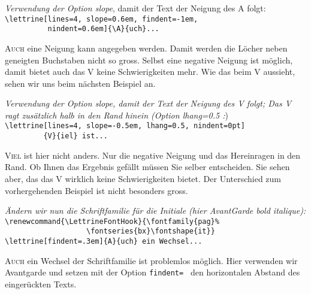 \documentclass[12pt,a4paper]{article}
\begin{document}
\vspace{\baselineskip}
\textit{Verwendung der Option {\ttfamily\upshape slope}}, damit der Text
der Neigung des {\glqq}A{\grqq} folgt:\\
\verb+\lettrine[lines=4, slope=0.6em, findent=-1em,+\\
\verb+          nindent=0.6em]{\A}{uch}...+

\lettrine[lines=4, slope=0.6em, findent=-1em, nindent=0.6em]{A}{uch} eine
Neigung kann angegeben werden. Damit werden die L\"ocher neben geneigten
Buchstaben nicht so gross. Selbst eine negative Neigung ist m\"oglich, damit
bietet auch das {\glqq}V{\grqq} keine Schwierigkeiten mehr. Wie das beim
{\glqq}V{\grqq} aussieht, sehen wir uns beim n\"achsten Beispiel an.

\vspace{\baselineskip}
\textit{Verwendung der Option {\ttfamily\upshape slope}, damit der Text
der Neigung des {\ttfamily\upshape V} folgt; Das {\ttfamily\upshape V} ragt 
zus\"atzlich halb in den Rand hinein 
(Option {\ttfamily\upshape lhang=0.5} :})\\
\verb+\lettrine[lines=4, slope=-0.5em, lhang=0.5, nindent=0pt]+\\
\verb+         {V}{iel} ist...+

\lettrine[lines=4, slope=-0.5em, lhang=0.5, nindent=0pt]{V}{iel} ist hier
nicht anders. Nur die negative Neigung und das Hereinragen in den Rand. Ob
Ihnen das Ergebnis gef\"allt m\"ussen Sie selber entscheiden.  Sie sehen aber,
das das {\glqq}V{\grqq} wirklich keine Schwierigkeiten bietet. Der Unterschied
zum vorhergehenden Beispiel ist nicht besonders gross.

\vspace{\baselineskip}
\textit{\"Andern wir nun die Schriftfamilie f\"ur die Initiale
(hier AvantGarde bold italique):}\\
\verb+\renewcommand{\LettrineFontHook}{\fontfamily{pag}%+\\
\verb+                   \fontseries{bx}\fontshape{it}}+\\
\verb+\lettrine[findent=.3em]{A}{uch} ein Wechsel...+

{%
\renewcommand{\LettrineFontHook}{\fontfamily{pag}\fontseries{bx}\fontshape{it}}

\lettrine[findent=.3em]{A}{uch} ein Wechsel der Schriftfamilie ist problemlos
m\"oglich. Hier verwenden wir Avantgarde und setzen mit der Option
\verb+findent= + den horizontalen Abstand des einger\"uckten Texts.
\par}
\end{document}
